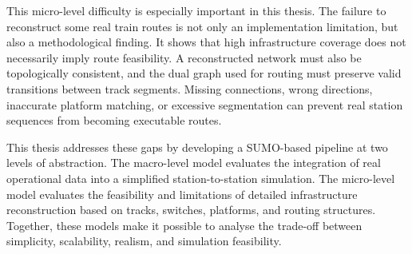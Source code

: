This micro-level difficulty is especially important in this thesis. The failure to reconstruct some real train routes is 
not only an implementation limitation, but also a methodological finding. It shows that high infrastructure coverage does 
not necessarily imply route feasibility. A reconstructed network must also be topologically consistent, and the dual graph 
used for routing must preserve valid transitions between track segments. Missing connections, wrong directions, inaccurate 
platform matching, or excessive segmentation can prevent real station sequences from becoming executable routes.

This thesis addresses these gaps by developing a SUMO-based pipeline at two levels of abstraction. The macro-level model 
evaluates the integration of real operational data into a simplified station-to-station simulation. The micro-level model 
evaluates the feasibility and limitations of detailed infrastructure reconstruction based on tracks, switches, platforms, 
and routing structures. Together, these models make it possible to analyse the trade-off between simplicity, scalability, 
realism, and simulation feasibility.